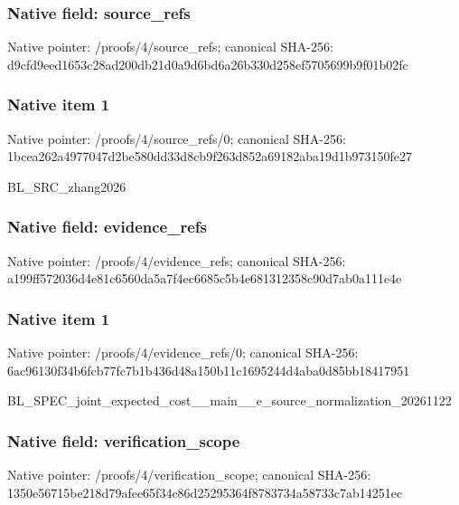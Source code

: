 \documentclass[10pt,a4paper]{article}
\begin{document}
\subsubsection{Native field: source\_refs}


Native pointer: /proofs/4/source\_refs; canonical SHA-256: d9cfd9eed1653c28ad200db2\allowbreak{}1d0a9d6bd6a26b330d258ef5\allowbreak{}705699b9f01b02fc



\subsubsection{Native item 1}


Native pointer: /proofs/4/source\_refs/0; canonical SHA-256: 1bcea262a4977047d2be580d\allowbreak{}d33d8cb9f263d852a69182ab\allowbreak{}a19d1b973150fe27


BL\_SRC\_zhang2026


\subsubsection{Native field: evidence\_refs}


Native pointer: /proofs/4/evidence\_refs; canonical SHA-256: a199ff572036d4e81c6560da\allowbreak{}5a7f4ec6685c5b4e68131235\allowbreak{}8c90d7ab0a111e4e



\subsubsection{Native item 1}


Native pointer: /proofs/4/evidence\_refs/0; canonical SHA-256: 6ac96130f34b6fcb77fc7b1b\allowbreak{}436d48a150b11c1695244d4a\allowbreak{}ba0d85bb18417951


BL\_SPEC\_joint\_expected\_c\allowbreak{}ost\_\_main\_\_e\_source\_norm\allowbreak{}alization\_20261122


\subsubsection{Native field: verification\_scope}


Native pointer: /proofs/4/verification\_scope; canonical SHA-256: 1350e56715be218d79afee65\allowbreak{}f34c86d25295364f8783734a\allowbreak{}58733c7ab14251ec
\end{document}

